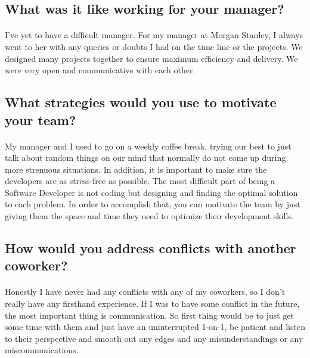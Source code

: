 \documentclass{article}
\begin{document}
\subsection{What was it like working for your manager?}

\paragraph{}

	I've yet to have a difficult manager. For my manager at Morgan Stanley, I always went to her with any queries or doubts I had on the time line or the projects. We designed many projects together to ensure maximum efficiency and delivery. We were very open and communicative with each other.  

\subsection{What strategies would you use to motivate your team?}

\paragraph{}

	My manager and I used to go on a weekly coffee break, trying our best to just talk about random things on our mind that normally do not come up during more strenuous situations. In addition, it is important to make sure the developers are as stress-free as possible. The most difficult part of being a Software Developer is not coding but designing and finding the optimal solution to each problem. In order to accomplish that, you can motivate the team by just giving them the space and time they need to optimize their development skills. 

\subsection{How would you address conflicts with another coworker?}

\paragraph{}

	Honestly I have never had any conflicts with any of my coworkers, so I don't really have any firsthand experience. If I was to have some conflict in the future, the most important thing is communication. So first thing would be to just get some time with them and just have an uninterrupted 1-on-1, be patient and listen to their perspective and smooth out any edges and any misunderstandings or any miscommunications. 
\end{document}
